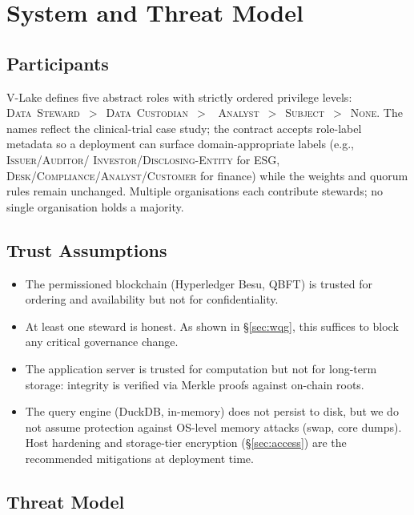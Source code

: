 \documentclass[10pt,twocolumn]{article}
\begin{document}
\section{System and Threat Model}
\label{sec:model}

\subsection{Participants}

V-Lake defines five abstract roles with strictly ordered privilege
levels:
\textsc{Data~Steward}~$>$~\textsc{Data~Custodian}~$>$%
~\textsc{Analyst}~$>$~\textsc{Subject}~$>$~\textsc{None}.
The names reflect the clinical-trial case study; the contract
accepts role-label metadata so a deployment can surface
domain-appropriate labels (e.g., \textsc{Issuer}/\textsc{Auditor}/%
\textsc{Investor}/\textsc{Disclosing-Entity} for ESG,
\textsc{Desk}/\textsc{Compliance}/\textsc{Analyst}/\textsc{Customer}
for finance) while the weights and quorum rules remain unchanged.
Multiple organisations each contribute stewards; no single
organisation holds a majority.

\subsection{Trust Assumptions}

\begin{itemize}[leftmargin=*,topsep=3pt,itemsep=2pt]
\item The permissioned blockchain (Hyperledger Besu, QBFT) is
  trusted for ordering and availability but not for
  confidentiality.
\item At least one steward is honest. As shown in
  \S\ref{sec:wqg}, this suffices to block any critical governance
  change.
\item The application server is trusted for computation but not
  for long-term storage: integrity is verified via Merkle proofs
  against on-chain roots.
\item The query engine (DuckDB, in-memory) does not persist to
  disk, but we do not assume protection against OS-level memory
  attacks (swap, core dumps). Host hardening and storage-tier
  encryption (\S\ref{sec:access}) are the recommended mitigations
  at deployment time.
\end{itemize}

\subsection{Threat Model}
\end{document}
